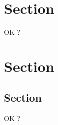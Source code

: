 \documentclass{article}
\begin{document}
\section{Section}

OK ?

\section{Section}

\subsection{Section}

OK ?
\end{document}
